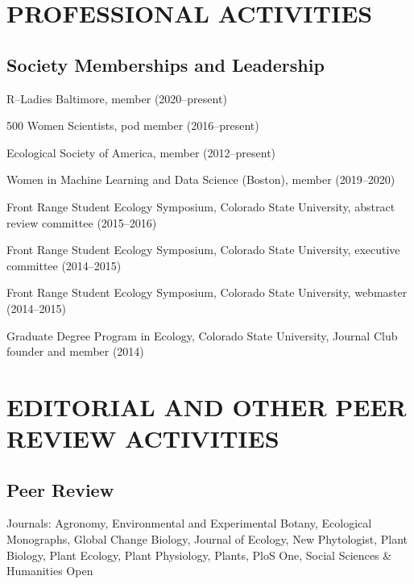 \documentclass{cv}
\begin{document}
\section*{PROFESSIONAL ACTIVITIES}

\subsection*{Society Memberships and Leadership}

R--Ladies Baltimore, member (2020--present)

500 Women Scientists, pod member (2016--present)

Ecological Society of America, member (2012--present)

Women in Machine Learning and Data Science (Boston), member (2019--2020)

Front Range Student Ecology Symposium, Colorado State University, abstract review committee (2015--2016)

Front Range Student Ecology Symposium, Colorado State University, executive committee (2014--2015)

Front Range Student Ecology Symposium, Colorado State University, webmaster (2014--2015)

Graduate Degree Program in Ecology, Colorado State University, Journal Club founder and member (2014)


\section*{EDITORIAL AND OTHER PEER REVIEW ACTIVITIES}

\subsection*{Peer Review}

Journals: Agronomy, Environmental and Experimental Botany, Ecological Monographs, Global Change Biology, Journal of Ecology, New Phytologist, Plant Biology, Plant Ecology, Plant Physiology, Plants, PloS One, Social Sciences \& Humanities Open

\end{document}

